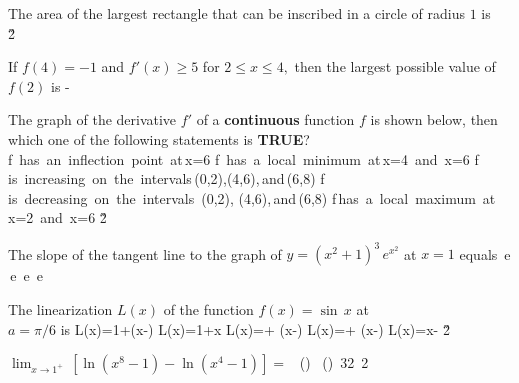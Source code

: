 \documentclass[amsfonts,bezier,leqno,fleqn,12pt,a4paper]{article}
\begin{document}
{{{\begin{large}
\newpage



\item %
The area of the largest rectangle that can be inscribed in a circle of radius $1$ is
\sc
\be
{}\,
\ee
{}
\ee
\be
\displaystyle {}
\ee
{}\,\pi
\ee
{}
\ee
\v2



\item %
If $f(4)=-1$ and $f'(x)\geq 5$ for $2\leq x \leq 4,$ then the largest possible value of $f(2)$ is
\sc
\be
\displaystyle -
\ee
{}
\ee
{}
\ee
{}
\ee
{}
\ee

\newpage



\item %
The graph of the derivative $f'$ of a \textbf{continuous} function $f$ is shown below, then which one of the following statements is \textbf{TRUE}?\\[0.5in]
\sc
\be
f\, \mbox{has an inflection point at}\,x=6
\ee
\be
f\, \mbox{has a local minimum at}\,x=4 \,\mbox{and}\, x=6
\ee
\be
f\,\mbox{is increasing on the intervals}\,(0,2),(4,6),\,\mbox{and}\,(6,8)
\ee
\be
f\, \mbox{is decreasing on the intervals}\, (0,2), (4,6),\,\mbox{and}\,(6,8)
\ee
\be
f\,\mbox{has a local maximum at}\,x=2 \,\mbox{and}\, x=6
\ee
\v2



\item %
The slope of the tangent line to the graph of $y=(x^2+1)^3\,e^{x^2}$ at $x=1$ equals
\sc
{}\,e
\ee
{}\,e
\ee
{}
\ee
{}\,e
\ee
{}\,e
\ee

\newpage



\item %
The linearization  $L(x)$ of the function $f(x)=\sin\,x$ at \\$a=\pi/6$ is
\sc
\be
\displaystyle L(x)=1+\left(x-\right)
\ee
\be
\displaystyle L(x)=1+x
\ee
\be
\displaystyle L(x)=+ \left(x-\right)
\ee
\be
\displaystyle L(x)=+ \left(x-\right)
\ee
\be
\displaystyle L(x)=x-
\ee
\v2



\item %
$\displaystyle \lim_{x\rightarrow 1^+}\, \left[ \ln(x^8-1)-\ln(x^4-1)\right]=$
\sc
\be
\displaystyle \ln\, \left(\displaystyle{}\right)
\ee
{}
\ee
\be
\displaystyle \ln\, \left(\displaystyle{}\right)
\ee
\be
\ln\,32
\ee
\be
\ln\,2
\ee


\end{large}}}}
\end{document}
